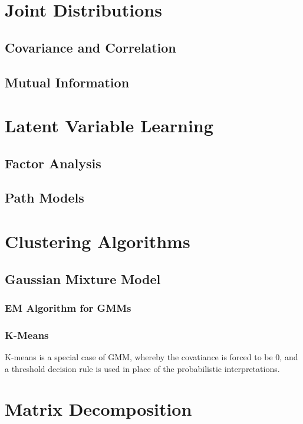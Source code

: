 \documentclass[]{article}
\begin{document}
\section{Joint Distributions}

\subsection{Covariance and Correlation}

\subsection{Mutual Information}

\section{Latent Variable Learning}

\subsection{Factor Analysis}

\subsection{Path Models}

\section{Clustering Algorithms}\subsection{Gaussian Mixture Model}

\subsubsection{EM Algorithm for GMMs}

\subsubsection{K-Means}

K-means is a special case of GMM, whereby the covatiance is forced to be
0, and a threshold decision rule is used in place of the probabilistic
interpretations.

\section{Matrix Decomposition}
\end{document}
